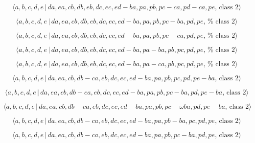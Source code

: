 \documentclass[10pt]{article}
\begin{document}
\begin{equation}
\langle a,b,c,d,e\,|\,da,ea,cb,db,eb,dc,ec,ed-ba,pa,pb,pc-ca,pd-ca,pe,\,%
\text{class }2\rangle  \tag{7.4621}
\end{equation}

\begin{equation}
\langle a,b,c,d,e\,|\,da,ea,cb,db,eb,dc,ec,ed-ba,pa,pb,pc-ba,pd,pe,\,\text{%
class }2\rangle  \tag{7.4622}
\end{equation}

\begin{equation}
\langle a,b,c,d,e\,|\,da,ea,cb,db,eb,dc,ec,ed-ba,pa,pb,pc-ca,pd,pe,\,\text{%
class }2\rangle  \tag{7.4623}
\end{equation}

\begin{equation}
\langle a,b,c,d,e\,|\,da,ea,cb,db,eb,dc,ec,ed-ba,pa-ba,pb,pc,pd,pe,\,\text{%
class }2\rangle  \tag{7.4624}
\end{equation}

\begin{equation}
\langle a,b,c,d,e\,|\,da,ea,cb,db,eb,dc,ec,ed-ba,pa-ca,pb,pc,pd,pe,\,\text{%
class }2\rangle  \tag{7.4625}
\end{equation}

\begin{equation}
\langle a,b,c,d,e\,|\,da,ea,cb,db-ca,eb,dc,ec,ed-ba,pa,pb,pc,pd,pe-ba,\,%
\text{class }2\rangle  \tag{7.4626}
\end{equation}

\begin{equation}
\langle a,b,c,d,e\,|\,da,ea,cb,db-ca,eb,dc,ec,ed-ba,pa,pb,pc-ba,pd,pe-ba,\,%
\text{class }2\rangle  \tag{7.4627}
\end{equation}

\begin{equation}
\langle a,b,c,d,e\,|\,da,ea,cb,db-ca,eb,dc,ec,ed-ba,pa,pb,pc-\omega
ba,pd,pe-ba,\,\text{class }2\rangle  \tag{7.4628}
\end{equation}

\begin{equation}
\langle a,b,c,d,e\,|\,da,ea,cb,db-ca,eb,dc,ec,ed-ba,pa,pb-ba,pc,pd,pe,\,%
\text{class }2\rangle  \tag{7.4629}
\end{equation}

\begin{equation}
\langle a,b,c,d,e\,|\,da,ea,cb,db-ca,eb,dc,ec,ed-ba,pa,pb,pc-ba,pd,pe,\,%
\text{class }2\rangle  \tag{7.4630}
\end{equation}
\end{document}

